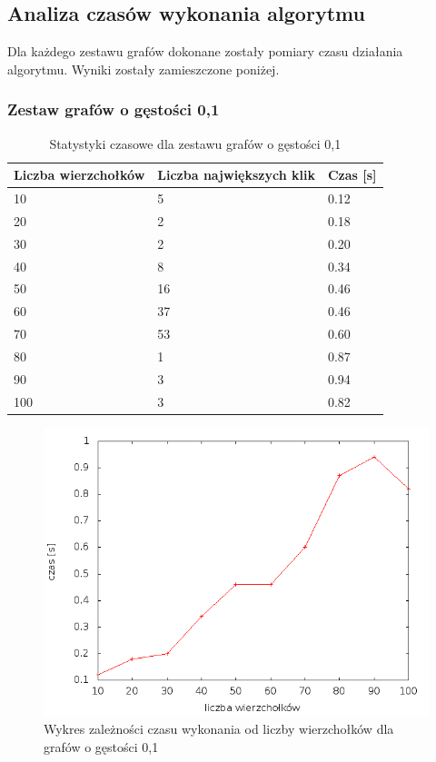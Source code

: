 \documentclass[12pt, a4paper]{article}
\begin{document}
\subsection{Analiza czasów wykonania algorytmu}
\label{testy}
Dla każdego zestawu grafów dokonane zostały pomiary czasu działania algorytmu. Wyniki zostały zamieszczone poniżej.
\newpage
\subsubsection*{Zestaw grafów o gęstości 0,1}
\begin{table}[H]
\caption{Statystyki czasowe dla zestawu grafów o gęstości 0,1}
\begin{center}
    \begin{tabular}{|l|l|l|}
    \hline
    Liczba wierzchołków & Liczba największych klik & Czas [s] \\ \hline
    10 & 5 & 0.12 \\ \hline
    20 & 2 & 0.18 \\ \hline
    30 & 2 & 0.20 \\ \hline
    40 & 8 & 0.34 \\ \hline
    50 & 16 & 0.46 \\ \hline
    60 & 37 & 0.46 \\ \hline
    70 & 53 & 0.60 \\ \hline
    80 & 1 & 0.87 \\ \hline
    90 & 3 & 0.94 \\ \hline
    100 & 3 & 0.82 \\ \hline
    \end{tabular}
\end{center}
\end{table}

\begin{figure}[h]
    \begin{center}
	\includegraphics[scale=0.5]{results/img/den/den_01.png}
	\caption{Wykres zależności czasu wykonania od liczby wierzchołków dla grafów o gęstości 0,1}
    \end{center}
\end{figure}
\end{document}
